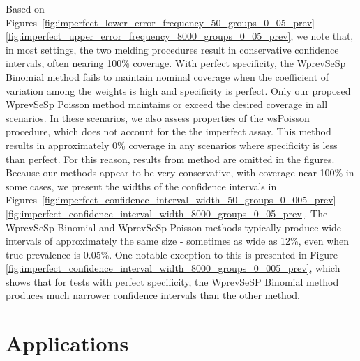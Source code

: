 \documentclass[AMA,STIX1COL]{WileyNJD-v2}
\begin{document}
Based on Figures~\ref{fig:imperfect_lower_error_frequency_50_groups_0_05_prev}--\ref{fig:imperfect_upper_error_frequency_8000_groups_0_05_prev}, we note that, in most settings, the two melding procedures result in conservative confidence intervals, often nearing 100\% coverage.
With perfect specificity, the WprevSeSp Binomial method fails to maintain nominal coverage when the coefficient of variation among the weights is high and specificity is perfect.
Only our proposed WprevSeSp Poisson method maintains or exceed the desired coverage in all scenarios.
In these scenarios, we also assess properties of the wsPoisson procedure, which does not account for the the imperfect assay.
This method results in approximately 0\% coverage in any scenarios where specificity is less than perfect.
For this reason, results from method are omitted in the figures.
Because our methods appear to be very conservative, with coverage near 100\% in some cases, we present the widths of the confidence intervals in Figures~\ref{fig:imperfect_confidence_interval_width_50_groups_0_005_prev}--\ref{fig:imperfect_confidence_interval_width_8000_groups_0_05_prev}.
The WprevSeSp Binomial and  WprevSeSp Poisson methods typically produce wide intervals of approximately the same size - sometimes as wide as 12\%, even when true prevalence is 0.05\%.
One notable exception to this is presented in Figure \ref{fig:imperfect_confidence_interval_width_8000_groups_0_005_prev}, which shows that for tests with perfect specificity, the WprevSeSP Binomial method produces much narrower confidence intervals than the other method.

\section{Applications}
\label{sec-Application}
\end{document}
